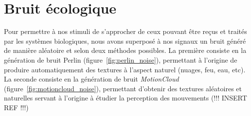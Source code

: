 \section{Bruit écologique}
Pour permettre à nos stimuli de s'approcher de ceux pouvant être reçus et traités par les systèmes biologiques, nous avons superposé à nos signaux un bruit généré de manière aléatoire et selon deux méthodes possibles.
La première consiste en la génération de bruit Perlin \autocite{Perlin1985} (figure~\ref{fig:perlin_noise}), permettant à l'origine de produire automatiquement des textures à l'aspect naturel (nuages, feu, eau, etc).
La seconde consiste en la génération de bruit \textit{MotionCloud} (figure~\ref{fig:motioncloud_noise}), permettant d'obtenir des textures aléatoires et naturelles servant à l'origine à étudier la perception des mouvements (!!! INSERT REF !!!) \\


